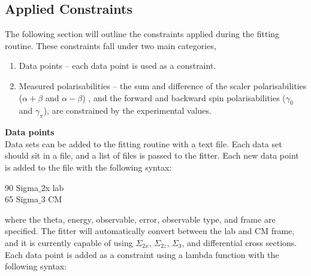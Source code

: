 \documentclass[]{article}
\begin{document}
\subsection{Applied Constraints}

The following section will outline the constraints applied during the fitting routine. These constraints fall under two main categories,

\begin{enumerate}
	\item Data points -- each data point is used as a constraint.
	\item Measured polarisabilities -- the sum and difference of the scaler polarisabilities ($\alpha+\beta$ and $\alpha-\beta$) , and the forward and backward spin polarisabilities ($\gamma_0$ and $\gamma_{\pi}$), are constrained by the experimental values.
\end{enumerate}

\vspace{3mm}

\noindent \textbf{Data points} \\

Data sets can be added to the fitting routine with a text file. Each data set should sit in a file, and a list of files is passed to the fitter. Each new data point is added to the file with the following syntax:

\begin{center}
	90    \quad Sigma$\_$2x \quad lab\\
	\hspace{1mm}65    \quad Sigma$\_$3 \quad \hspace{2mm}CM\\
\end{center}

\noindent where the theta, energy, observable, error, observable type, and frame are specified. The fitter will automatically convert between the lab and CM frame, and it is currently capable of using $\Sigma_{2x}$, $\Sigma_{2z}$, $\Sigma_{3}$, and differential cross sections. Each data point is added as a constraint using a lambda function with the following syntax:\\
\end{document}
